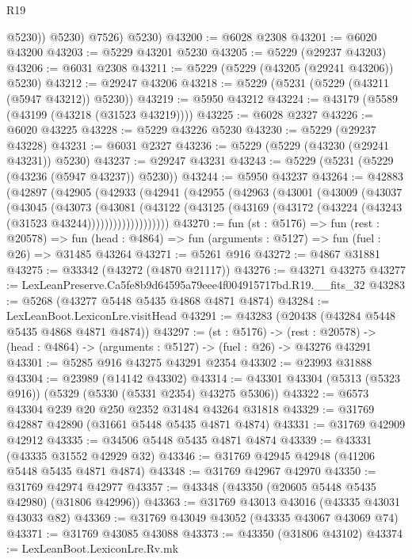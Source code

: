 \begin{lexlean}{R19}
\begin{coremodule}
              @5230))
          @5230)
        @7526)
      @5230)
@43200 := @6028 @2308
@43201 := @6020 @43200
@43203 := @5229 @43201 @5230
@43205 := @5229 (@29237 @43203)
@43206 := @6031 @2308
@43211 := @5229 (@5229 (@43205 (@29241 @43206)) @5230)
@43212 := @29247 @43206
@43218 := @5229 (@5231 (@5229 (@43211 (@5947 @43212)) @5230))
@43219 := @5950 @43212
@43224 := @43179 (@5589 (@43199 (@43218 (@31523 @43219))))
@43225 := @6028 @2327
@43226 := @6020 @43225
@43228 := @5229 @43226 @5230
@43230 := @5229 (@29237 @43228)
@43231 := @6031 @2327
@43236 := @5229 (@5229 (@43230 (@29241 @43231)) @5230)
@43237 := @29247 @43231
@43243 := @5229 (@5231 (@5229 (@43236 (@5947 @43237)) @5230))
@43244 := @5950 @43237
@43264 := @42883
    (@42897
      (@42905
        (@42933
          (@42941
            (@42955
              (@42963
                (@43001
                  (@43009
                    (@43037
                      (@43045
                        (@43073
                          (@43081
                            (@43122
                              (@43125
                                (@43169 (@43172 (@43224 (@43243 (@31523 @43244)))))))))))))))))))
@43270 := fun (st : @5176) =>
  fun (rest : @20578) =>
  fun (head : @4864) => fun (arguments : @5127) => fun (fuel : @26) => @31485 @43264
@43271 := @5261 @916
@43272 := @4867 @31881
@43275 := @33342 (@43272 (@4870 @21117))
@43276 := @43271 @43275
@43277 := LexLeanPreserve.Ca5fe8b9d64595a79eee4f004915717bd.R19.__fits_32
@43283 := @5268 (@43277 @5448 @5435 @4868 @4871 @4874)
@43284 := LexLeanBoot.LexiconLre.visitHead
@43291 := @43283 (@20438 (@43284 @5448 @5435 @4868 @4871 @4874))
@43297 := (st : @5176) ->
  (rest : @20578) -> (head : @4864) -> (arguments : @5127) -> (fuel : @26) -> @43276 @43291
@43301 := @5285 @916 @43275 @43291 @2354
@43302 := @23993 @31888
@43304 := @23989 (@14142 @43302)
@43314 := @43301 @43304 (@5313 (@5323 @916)) (@5329 (@5330 (@5331 @2354) @43275 @5306))
@43322 := @6573 @43304 @239 @20 @250 @2352 @31484 @43264 @31818
@43329 := @31769 @42887 @42890 (@31661 @5448 @5435 @4871 @4874)
@43331 := @31769 @42909 @42912
@43335 := @34506 @5448 @5435 @4871 @4874
@43339 := @43331 (@43335 @31552 @42929 @32)
@43346 := @31769 @42945 @42948 (@41206 @5448 @5435 @4871 @4874)
@43348 := @31769 @42967 @42970
@43350 := @31769 @42974 @42977
@43357 := @43348 (@43350 (@20605 @5448 @5435 @42980) (@31806 @42996))
@43363 := @31769 @43013 @43016 (@43335 @43031 @43033 @82)
@43369 := @31769 @43049 @43052 (@43335 @43067 @43069 @74)
@43371 := @31769 @43085 @43088
@43373 := @43350 (@31806 @43102)
@43374 := LexLeanBoot.LexiconLre.Rv.mk

\end{coremodule}
\end{lexlean}
